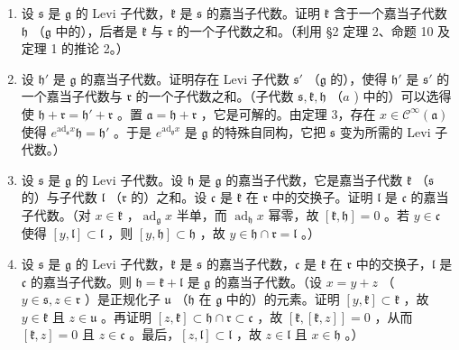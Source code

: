 \begin{enumerate}
\def\labelenumi{\alph{enumi})}
\item
  设 \(\mathfrak{s}\) 是 \(\mathfrak{g}\) 的 Levi 子代数，\(\mathfrak{k}\) 是 \(\mathfrak{s}\) 的嘉当子代数。证明 \(\mathfrak{k}\) 含于一个嘉当子代数 \(\mathfrak{h}\) （\(\mathfrak{g}\) 中的），后者是 \(\mathfrak{k}\) 与 \(\mathfrak{r}\) 的一个子代数之和。（利用 §2 定理 2、命题 10 及定理 1 的推论 2。）
\item
  设 \(\mathfrak{h}'\) 是 \(\mathfrak{g}\) 的嘉当子代数。证明存在 Levi 子代数 \(\mathfrak{s}'\) （\(\mathfrak{g}\) 的），使得 \(\mathfrak{h}'\) 是 \(\mathfrak{s}'\) 的一个嘉当子代数与 \(\mathfrak{r}\) 的一个子代数之和。（子代数 \(\mathfrak{s}, \mathfrak{k}, \mathfrak{h}\) （\(a\) ) 中的）可以选得使 \(\mathfrak{h} + \mathfrak{r} = \mathfrak{h}' + \mathfrak{r}\) 。置 \(\mathfrak{a} = \mathfrak{h} + \mathfrak{r}\) ，它是可解的。由定理 3，存在 \(x \in \mathcal{C}^{\infty}(\mathfrak{a})\) 使得 \(e^{\mathrm{ad}_{\mathfrak{a}}x}\mathfrak{h} = \mathfrak{h}'\) 。于是 \(e^{\mathrm{ad}_{\mathfrak{g}}x}\) 是 \(\mathfrak{g}\) 的特殊自同构，它把 \(\mathfrak{s}\) 变为所需的 Levi 子代数。）
\item
  设 \(\mathfrak{s}\) 是 \(\mathfrak{g}\) 的 Levi 子代数。设 \(\mathfrak{h}\) 是 \(\mathfrak{g}\) 的嘉当子代数，它是嘉当子代数 \(\mathfrak{k}\) （\(\mathfrak{s}\) 的）与子代数 \(\mathfrak{l}\) （\(\mathfrak{r}\) 的）之和。设 \(\mathfrak{c}\) 是 \(\mathfrak{k}\) 在 \(\mathfrak{r}\) 中的交换子。证明 \(\mathfrak{l}\) 是 \(\mathfrak{c}\) 的嘉当子代数。（对 \(x \in \mathfrak{k}\) ，\(\operatorname{ad}_{\mathfrak{g}} x\) 半单，而 \(\operatorname{ad}_{\mathfrak{h}} x\) 幂零，故 \([\mathfrak{k}, \mathfrak{h}] = 0\) 。若 \(y \in \mathfrak{c}\) 使得 \([y, \mathfrak{l}] \subset \mathfrak{l}\) ，则 \([y, \mathfrak{h}] \subset \mathfrak{h}\) ，故 \(y \in \mathfrak{h} \cap \mathfrak{r} = \mathfrak{l}\) 。）
\item
  设 \(\mathfrak{s}\) 是 \(\mathfrak{g}\) 的 Levi 子代数，\(\mathfrak{k}\) 是 \(\mathfrak{s}\) 的嘉当子代数，\(\mathfrak{c}\) 是 \(\mathfrak{k}\) 在 \(\mathfrak{r}\) 中的交换子，\(\mathfrak{l}\) 是 \(\mathfrak{c}\) 的嘉当子代数。则 \(\mathfrak{h} = \mathfrak{k} + \mathfrak{l}\) 是 \(\mathfrak{g}\) 的嘉当子代数。（设 \(x = y + z\) （ \(y \in \mathfrak{s}, z \in \mathfrak{r}\) ）是正规化子 \(\mathfrak{u}\) （\(\mathfrak{h}\) 在 \(\mathfrak{g}\) 中的）的元素。证明 \([y, \mathfrak{k}] \subset \mathfrak{k}\) ，故 \(y \in \mathfrak{k}\) 且 \(z \in \mathfrak{u}\) 。再证明 \([z, \mathfrak{k}] \subset \mathfrak{h} \cap \mathfrak{r} \subset \mathfrak{c}\) ，故 \([\mathfrak{k}, [\mathfrak{k}, z]] = 0\) ，从而 \([\mathfrak{k}, z] = 0\) 且 \(z \in \mathfrak{c}\) 。最后，\([z, \mathfrak{l}] \subset \mathfrak{l}\) ，故 \(z \in \mathfrak{l}\) 且 \(x \in \mathfrak{h}\) 。）

\end{enumerate}
